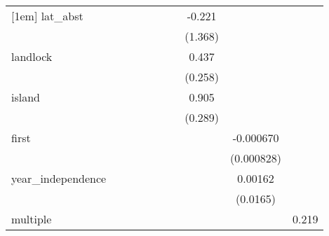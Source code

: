 {\begin{tabular}{l*{9}{c}}
[1em]
lat\_abst    &                     &                     &                     &                     &                     &                     &      -0.221         &                     &                     \\
            &                     &                     &                     &                     &                     &                     &     (1.368)         &                     &                     \\
[1em]
landlock    &                     &                     &                     &                     &                     &                     &       0.437\sym{*}  &                     &                     \\
            &                     &                     &                     &                     &                     &                     &     (0.258)         &                     &                     \\
[1em]
island      &                     &                     &                     &                     &                     &                     &       0.905\sym{***}&                     &                     \\
            &                     &                     &                     &                     &                     &                     &     (0.289)         &                     &                     \\
[1em]
first       &                     &                     &                     &                     &                     &                     &                     &   -0.000670         &                     \\
            &                     &                     &                     &                     &                     &                     &                     &  (0.000828)         &                     \\
[1em]
year\_independence&                     &                     &                     &                     &                     &                     &                     &     0.00162         &                     \\
            &                     &                     &                     &                     &                     &                     &                     &    (0.0165)         &                     \\
[1em]
multiple    &                     &                     &                     &                     &                     &                     &                     &                     &       0.219         \\

\end{tabular}}
